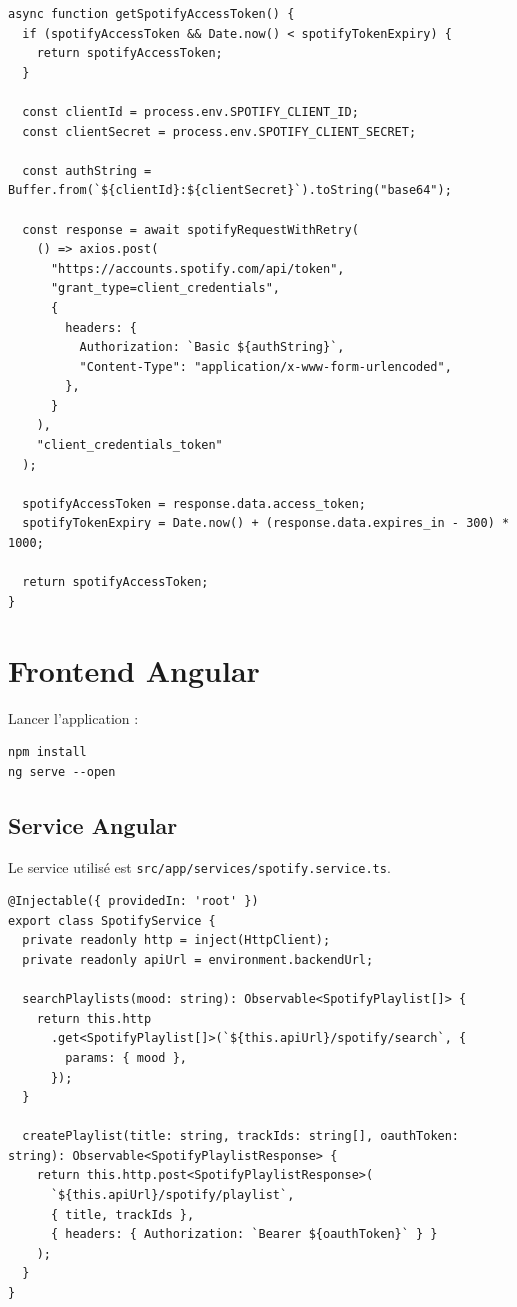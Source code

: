 \documentclass[a4paper,11pt]{article}
\begin{document}
\begin{lstlisting}
async function getSpotifyAccessToken() {
  if (spotifyAccessToken && Date.now() < spotifyTokenExpiry) {
    return spotifyAccessToken;
  }

  const clientId = process.env.SPOTIFY_CLIENT_ID;
  const clientSecret = process.env.SPOTIFY_CLIENT_SECRET;

  const authString = Buffer.from(`${clientId}:${clientSecret}`).toString("base64");

  const response = await spotifyRequestWithRetry(
    () => axios.post(
      "https://accounts.spotify.com/api/token",
      "grant_type=client_credentials",
      {
        headers: {
          Authorization: `Basic ${authString}`,
          "Content-Type": "application/x-www-form-urlencoded",
        },
      }
    ),
    "client_credentials_token"
  );

  spotifyAccessToken = response.data.access_token;
  spotifyTokenExpiry = Date.now() + (response.data.expires_in - 300) * 1000;

  return spotifyAccessToken;
}
\end{lstlisting}

\section{Frontend Angular}

Lancer l'application :

\begin{lstlisting}
npm install
ng serve --open
\end{lstlisting}

\subsection{Service Angular}

Le service utilisé est \texttt{src/app/services/spotify.service.ts}.

\begin{lstlisting}
@Injectable({ providedIn: 'root' })
export class SpotifyService {
  private readonly http = inject(HttpClient);
  private readonly apiUrl = environment.backendUrl;

  searchPlaylists(mood: string): Observable<SpotifyPlaylist[]> {
    return this.http
      .get<SpotifyPlaylist[]>(`${this.apiUrl}/spotify/search`, {
        params: { mood },
      });
  }

  createPlaylist(title: string, trackIds: string[], oauthToken: string): Observable<SpotifyPlaylistResponse> {
    return this.http.post<SpotifyPlaylistResponse>(
      `${this.apiUrl}/spotify/playlist`,
      { title, trackIds },
      { headers: { Authorization: `Bearer ${oauthToken}` } }
    );
  }
}
\end{lstlisting}
\end{document}

